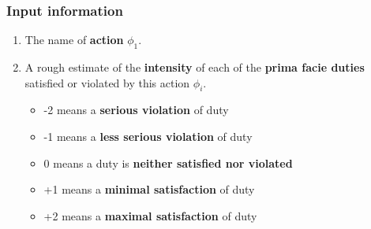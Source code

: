 \documentclass[11pt]{article}
\begin{document}
\subsubsection{Input information}
\label{sec:orge66726f}
\begin{enumerate}
\item The name of \textbf{action} \(\phi_1\).
\item A rough estimate of the \textbf{intensity} of each of the \textbf{prima facie duties} satisfied or violated by this action \(\phi_i\).
\begin{itemize}
\item -2 means a \textbf{serious violation} of duty
\item -1 means a \textbf{less serious violation} of duty
\item 0 means a duty is \textbf{neither satisfied nor violated}
\item +1 means a \textbf{minimal satisfaction} of duty
\item +2 means a \textbf{maximal satisfaction} of duty
\end{itemize}
\end{enumerate}

 \newpage
\end{document}
